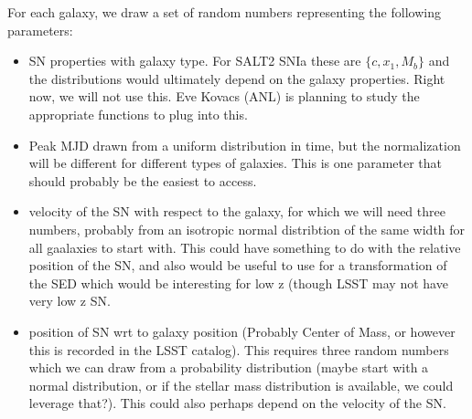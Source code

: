\documentclass{article}[12pt]
\begin{document}
For each galaxy, we draw a set of random numbers representing the following 
parameters:
\begin{itemize}
\item SN properties with galaxy type. For SALT2 SNIa these are $\{c, x_1, M_b\}$ 
and the distributions would ultimately depend on the galaxy properties. Right now,
we will not use this. Eve Kovacs (ANL) is planning to study the appropriate 
functions to plug into this. 
\item Peak MJD drawn from a uniform distribution in time, but the normalization 
will be different for different types of galaxies. This is one parameter that 
should probably be the easiest to access. 
\item velocity of the SN with respect to the galaxy, for which we will need three numbers, probably from an isotropic normal distribtion of the same width for all gaalaxies to start with.  This could have something to do with the relative position
of the SN, and also would be useful to use for a transformation of the SED which 
would be interesting for low z (though LSST may not have very low z SN. 
\item position of SN wrt to galaxy position (Probably Center of Mass, or however 
this is recorded in the LSST catalog). This requires three random numbers which 
we can draw from a probability distribution (maybe start with a normal distribution, or if the stellar mass distribution is available, we could leverage that?). This
could also perhaps depend on the velocity of the SN.
\end{itemize} 
%

\end{document}
